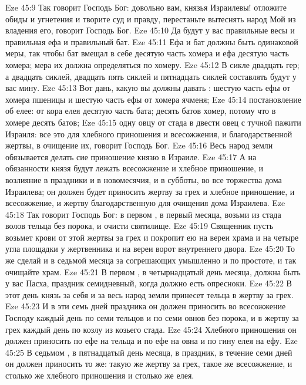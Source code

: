 \vs Eze 45:9 Так говорит Господь Бог: довольно вам, князья Израилевы! отложите обиды и угнетения и творите суд и правду, перестаньте вытеснять народ Мой из владения его, говорит Господь Бог.
\vs Eze 45:10 Да будут у вас правильные весы и правильная ефа и правильный бат.
\vs Eze 45:11 Ефа и бат должны быть одинаковой меры, так чтобы бат вмещал в себе десятую часть хомера и ефа десятую часть хомера; мера их должна определяться по хомеру.
\vs Eze 45:12 В сикле двадцать гер; а двадцать сиклей, двадцать пять сиклей и пятнадцать сиклей составлять будут у вас мину.
\vs Eze 45:13 Вот дань, какую вы должны давать : шестую часть ефы от хомера пшеницы и шестую часть ефы от хомера ячменя;
\vs Eze 45:14 постановление об елее: от кора елея десятую часть бата; десять батов  хомер, потому что в хомере десять батов;
\vs Eze 45:15 одну овцу от стада в двести овец с тучной пажити Израиля: все это для хлебного приношения и всесожжения, и благодарственной жертвы, в очищение их, говорит Господь Бог.
\vs Eze 45:16 Весь народ земли обязывается делать сие приношение князю в Израиле.
\vs Eze 45:17 А на обязанности князя будут лежать всесожжение и хлебное приношение, и возлияние в праздники и в новомесячия, и в субботы, во все торжества дома Израилева; он должен будет приносить жертву за грех и хлебное приношение, и всесожжение, и жертву благодарственную для очищения дома Израилева.
\vs Eze 45:18 Так говорит Господь Бог: в первом , в первый  месяца, возьми из стада волов тельца без порока, и очисти святилище.
\vs Eze 45:19 Священник пусть возьмет крови от этой жертвы за грех и покропит ею на вереи храма и на четыре угла площадки у жертвенника и на вереи ворот внутреннего двора.
\vs Eze 45:20 То же сделай и в седьмой  месяца за согрешающих умышленно и по простоте, и так очищайте храм.
\vs Eze 45:21 В первом , в четырнадцатый день месяца, должна быть у вас Пасха, праздник семидневный, когда должно есть опресноки.
\vs Eze 45:22 В этот день князь за себя и за весь народ земли принесет тельца в жертву за грех.
\vs Eze 45:23 И в эти семь дней праздника он должен приносить во всесожжение Господу каждый день по семи тельцов и по семи овнов без порока, и в жертву за грех каждый день по козлу из козьего стада.
\vs Eze 45:24 Хлебного приношения он должен приносить по ефе на тельца и по ефе на овна и по гину елея на ефу.
\vs Eze 45:25 В седьмом , в пятнадцатый день месяца, в праздник, в течение семи дней он должен приносить то же: такую же жертву за грех, такое же всесожжение, и столько же хлебного приношения и столько же елея.
